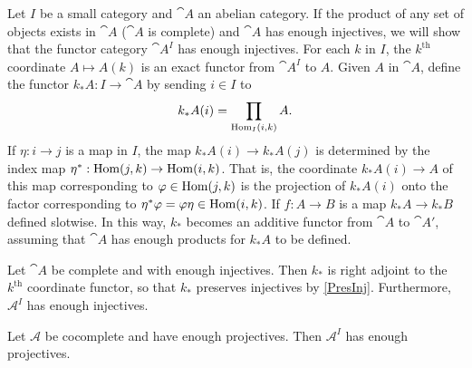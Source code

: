 \begin{example}
	Let $I$ be a small category and $\cat{A}$ an abelian category.
	If the product of any set of objects exists in $\cat{A}$ ($\cat{A}$ is complete) and $\cat{A}$ has enough injectives, we will show that the functor category $\cat{A}^I$ has enough injectives.
	For each $k$ in $I$, the $k^\text{th}$ coordinate $A\mapsto A(k)$ is an exact functor from $\cat{A}^I$ to $A$. Given $A$ in $\cat{A}$, define the functor $k_*A:I\rightarrow\cat{A}$ by sending $i\in I$ to
	$$k_*A(i)=\prod_{\operatorname{Hom}_{I}(i,k)}A.$$
	If $\eta:i\rightarrow j$ is a map in $I$, the map $k_*A(i)\rightarrow k_*A(j)$ is determined by the index map $\eta^*:\operatorname{Hom}(j,k)\rightarrow \operatorname{Hom}(i,k)$.
	That is, the coordinate $k_*A(i)\rightarrow A$ of this map corresponding to $\varphi\in\operatorname{Hom}(j,k)$ is the projection of $k_*A(i)$ onto the factor corresponding to $\eta^*\varphi=\varphi\eta\in\operatorname{Hom}(i,k)$.
	If $f:A\rightarrow B$ is a map $k_*A\rightarrow k_*B$ defined slotwise.
	In this way, $k_*$ becomes an additive functor from $\cat{A}$ to $\cat{A'}$, assuming that $\cat{A}$ has enough products for $k_*A$ to be defined.
\end{example}

\begin{exercise}
	Let $\cat{A}$ be complete and with enough injectives.
	Then $k_*$ is right adjoint to the $k^\text{th}$ coordinate functor, so that $k_*$ preserves injectives by \ref{PresInj}.
	Furthermore, $\mathcal{A}^I$ has enough injectives.
\end{exercise}

\begin{exercise}
	Let $\mathcal{A}$ be cocomplete and have enough projectives.
	Then $\mathcal{A}^I$ has enough projectives.
\end{exercise}